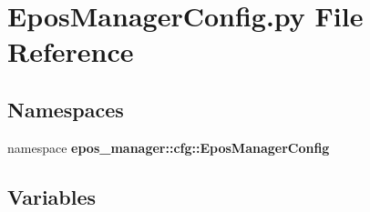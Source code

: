 \section{\-Epos\-Manager\-Config.\-py \-File \-Reference}
\label{EposManagerConfig_8py}
\subsection*{\-Namespaces}
\begin{DoxyCompactItemize}
\item 
namespace {\bf epos\-\_\-manager\-::cfg\-::\-Epos\-Manager\-Config}
\end{DoxyCompactItemize}
\subsection*{\-Variables}
